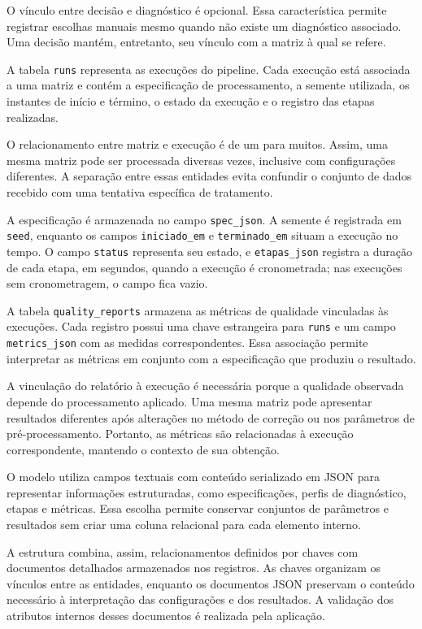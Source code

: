 O vínculo entre decisão e diagnóstico é opcional. Essa característica permite registrar escolhas manuais mesmo quando não existe um diagnóstico associado. Uma decisão mantém, entretanto, seu vínculo com a matriz à qual se refere.

A tabela \texttt{runs} representa as execuções do pipeline. Cada execução está associada a uma matriz e contém a especificação de processamento, a semente utilizada, os instantes de início e término, o estado da execução e o registro das etapas realizadas.

O relacionamento entre matriz e execução é de um para muitos. Assim, uma mesma matriz pode ser processada diversas vezes, inclusive com configurações diferentes. A separação entre essas entidades evita confundir o conjunto de dados recebido com uma tentativa específica de tratamento.

A especificação é armazenada no campo \texttt{spec\_\allowbreak{}json}. A semente é registrada em \texttt{seed}, enquanto os campos \texttt{iniciado\_\allowbreak{}em} e \texttt{terminado\_\allowbreak{}em} situam a execução no tempo. O campo \texttt{status} representa seu estado, e \texttt{etapas\_\allowbreak{}json} registra a duração de cada etapa, em segundos, quando a execução é cronometrada; nas execuções sem cronometragem, o campo fica vazio.

A tabela \texttt{quality\_\allowbreak{}reports} armazena as métricas de qualidade vinculadas às execuções. Cada registro possui uma chave estrangeira para \texttt{runs} e um campo \texttt{metrics\_\allowbreak{}json} com as medidas correspondentes. Essa associação permite interpretar as métricas em conjunto com a especificação que produziu o resultado.

A vinculação do relatório à execução é necessária porque a qualidade observada depende do processamento aplicado. Uma mesma matriz pode apresentar resultados diferentes após alterações no método de correção ou nos parâmetros de pré-processamento. Portanto, as métricas são relacionadas à execução correspondente, mantendo o contexto de sua obtenção.

O modelo utiliza campos textuais com conteúdo serializado em JSON para representar informações estruturadas, como especificações, perfis de diagnóstico, etapas e métricas. Essa escolha permite conservar conjuntos de parâmetros e resultados sem criar uma coluna relacional para cada elemento interno.

A estrutura combina, assim, relacionamentos definidos por chaves com documentos detalhados armazenados nos registros. As chaves organizam os vínculos entre as entidades, enquanto os documentos JSON preservam o conteúdo necessário à interpretação das configurações e dos resultados. A validação dos atributos internos desses documentos é realizada pela aplicação.

